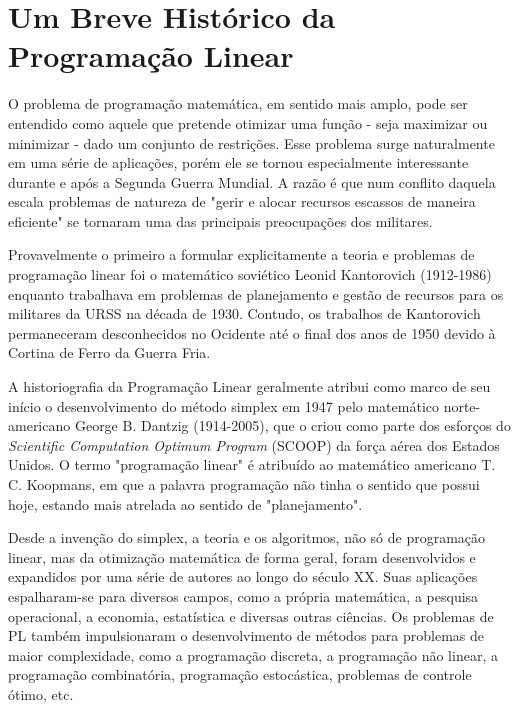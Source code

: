 \section{Um Breve Histórico da Programação Linear}

O problema de programação matemática, em sentido mais amplo, pode ser entendido como aquele que pretende otimizar uma função - seja maximizar ou minimizar - dado um conjunto de restrições. Esse problema surge naturalmente em uma série de aplicações, porém ele se tornou especialmente interessante durante e após a Segunda Guerra Mundial. A razão é que num conflito daquela escala problemas de natureza de "gerir e alocar recursos escassos de maneira eficiente" se tornaram uma das principais preocupações dos militares. 

Provavelmente o primeiro a formular explicitamente a teoria e problemas de programação linear foi o matemático soviético Leonid Kantorovich (1912-1986) enquanto trabalhava em problemas de planejamento e gestão de recursos para os militares da URSS na década de 1930. Contudo, os trabalhos de Kantorovich permaneceram desconhecidos no Ocidente até o final dos anos de 1950 devido à Cortina de Ferro da Guerra Fria.

A historiografia da Programação Linear geralmente atribui como marco de seu início o desenvolvimento do método simplex em 1947 pelo matemático norte-americano George B. Dantzig (1914-2005), que o criou como parte dos esforços do \textit{Scientific Computation Optimum Program} (SCOOP) da força aérea dos Estados Unidos. O termo "programação linear" é atribuído ao matemático americano T. C. Koopmans, em que a palavra programação não tinha o sentido que possui hoje, estando mais atrelada ao sentido de "planejamento".

Desde a invenção do simplex, a teoria e os algoritmos, não só de programação linear, mas da otimização matemática de forma geral, foram desenvolvidos e expandidos por uma série de autores ao longo do século XX. Suas aplicações espalharam-se para diversos campos, como a própria matemática, a pesquisa operacional, a economia, estatística e diversas outras ciências. Os problemas de PL também impulsionaram o desenvolvimento de métodos para problemas de maior complexidade, como a programação discreta, a programação não linear, a programação combinatória, programação estocástica, problemas de controle ótimo, etc.
